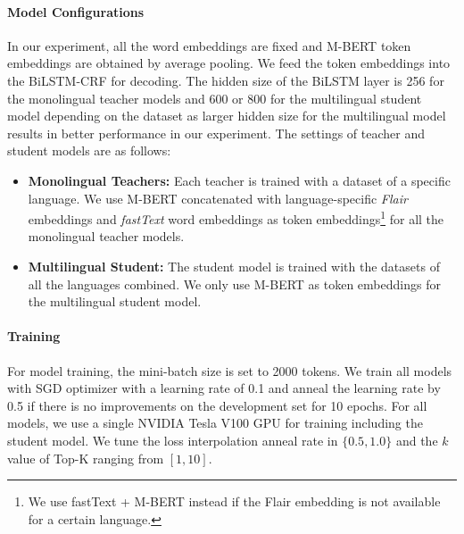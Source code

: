\documentclass[11pt,a4paper]{article}
\begin{document}
\paragraph{Model Configurations} 
In our experiment, all the word embeddings are fixed
and M-BERT token embeddings are obtained by average pooling. We feed the token embeddings into the BiLSTM-CRF for decoding. The hidden size of the BiLSTM layer is 256 for the monolingual teacher models and 600 or 800 for the multilingual student model depending on the dataset as larger hidden size for the multilingual model results in better performance in our experiment. The settings of teacher and student models are as follows:
\begin{itemize}
\item {\bf Monolingual Teachers:} Each teacher is trained with a dataset of a specific language. We use M-BERT concatenated with language-specific \textit{Flair} \cite{akbik-etal-2018-contextual} embeddings and \textit{fastText} \cite{bojanowski2017enriching} word embeddings as token embeddings\footnote{We use fastText + M-BERT instead if the Flair embedding is not available for a certain language.} for all the monolingual teacher models. 
    \item {\bf Multilingual Student:} The student model is trained with the datasets of all the languages combined. We only use M-BERT as token embeddings for the multilingual student model. 
\end{itemize}



\paragraph{Training} For model training, the mini-batch size is set to 2000 tokens. We train all models with SGD optimizer with a learning rate of 0.1 and anneal the learning rate by 0.5 if there is no improvements on the development set for 10 epochs. For all models, we use a single NVIDIA Tesla V100 GPU for training including the student model. We tune the loss interpolation anneal rate in $\{0.5,1.0\}$ and the $k$ value of Top-K ranging from $[1,10]$.
\end{document}
